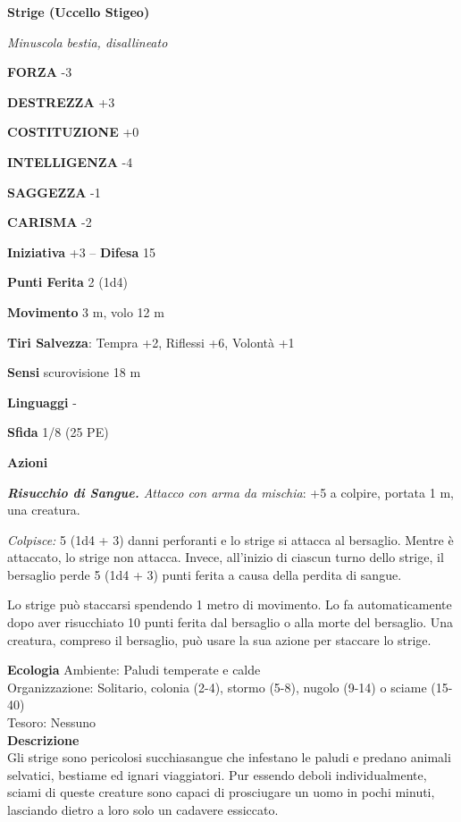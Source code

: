 \begin{multicols}{2}
\medskip{}\textbf{Strige (Uccello Stigeo)}

\emph{Minuscola bestia, disallineato}

\textbf{FORZA} -3

\textbf{DESTREZZA} +3

\textbf{COSTITUZIONE} +0

\textbf{INTELLIGENZA} -4

\textbf{SAGGEZZA} -1

\textbf{CARISMA} -2

\textbf{Iniziativa} +3 -- \textbf{Difesa} 15

\textbf{Punti Ferita} 2 (1d4)

\textbf{Movimento} 3 m, volo 12 m

\textbf{Tiri Salvezza}: Tempra +2, Riflessi +6, Volontà +1

\textbf{Sensi} scurovisione 18 m

\textbf{Linguaggi} -

\textbf{Sfida} 1/8 (25 PE)

\textbf{Azioni}

\emph{\textbf{Risucchio di Sangue.} Attacco con arma da mischia}: +5 a
colpire, portata 1 m, una creatura.

\emph{Colpisce:} 5 (1d4 + 3) danni perforanti e lo strige si attacca al
bersaglio. Mentre è attaccato, lo strige non attacca. Invece, all'inizio
di ciascun turno dello strige, il bersaglio perde 5 (1d4 + 3) punti
ferita a causa della perdita di sangue.

Lo strige può staccarsi spendendo 1 metro di movimento. Lo fa
automaticamente dopo aver risucchiato 10 punti ferita dal bersaglio o
alla morte del bersaglio. Una creatura, compreso il bersaglio, può usare
la sua azione per staccare lo strige.

\textbf{Ecologia}
Ambiente: Paludi temperate e calde\\
Organizzazione: Solitario, colonia (2-4), stormo (5-8), nugolo (9-14) o sciame (15-40)\\
Tesoro: Nessuno\\
\textbf{Descrizione}\\
Gli strige sono pericolosi succhiasangue che infestano le paludi e predano animali selvatici, bestiame ed ignari viaggiatori. Pur essendo deboli individualmente, sciami di queste creature sono capaci di prosciugare un uomo in pochi minuti, lasciando dietro a loro solo un cadavere essiccato.\\


\end{multicols}
